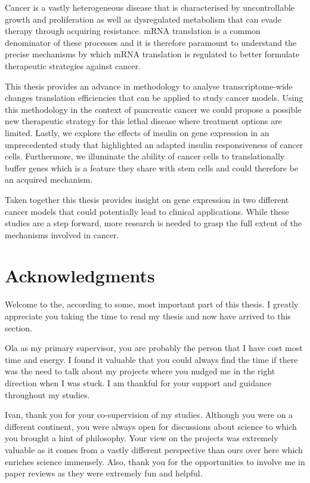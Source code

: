 \documentclass[12pt,openany]{book}
\begin{document}
Cancer is a vastly heterogeneous disease that is characterised by
uncontrollable growth and proliferation as well as dysregulated
metabolism that can evade therapy through acquiring resistance. mRNA
translation is a common denominator of these processes and it is
therefore paramount to understand the precise mechanisms by which mRNA
translation is regulated to better formulate therapeutic strategies
against cancer.

This thesis provides an advance in methodology to analyse
transcriptome-wide changes translation efficiencies that can be applied
to study cancer models. Using this methodology in the context of
pancreatic cancer we could propose a possible new therapeutic strategy
for this lethal disease where treatment options are limited. Lastly, we
explore the effects of insulin on gene expression in an unprecedented
study that highlighted an adapted insulin responsiveness of cancer
cells. Furthermore, we illuminate the ability of cancer cells to
translationally buffer genes which is a feature they share with stem
cells and could therefore be an acquired mechanism.

Taken together this thesis provides insight on gene expression in two
different cancer models that could potentially lead to clinical
applications. While these studies are a step forward, more research is
needed to grasp the full extent of the mechanisms involved in cancer.

\chapter*{Acknowledgments}\label{acknowledgments}

Welcome to the, according to some, most important part of this thesis. I
greatly appreciate you taking the time to read my thesis and now have
arrived to this section.

Ola as my primary supervisor, you are probably the person that I have
cost most time and energy. I found it valuable that you could always
find the time if there was the need to talk about my projects where you
nudged me in the right direction when I was stuck. I am thankful for
your support and guidance throughout my studies.

Ivan, thank you for your co-supervision of my studies. Although you were
on a different continent, you were always open for discussions about
science to which you brought a hint of philosophy. Your view on the
projects was extremely valuable as it comes from a vastly different
perspective than ours over here which enriches science immensely. Also,
thank you for the opportunities to involve me in paper reviews as they
were extremely fun and helpful.
\end{document}
